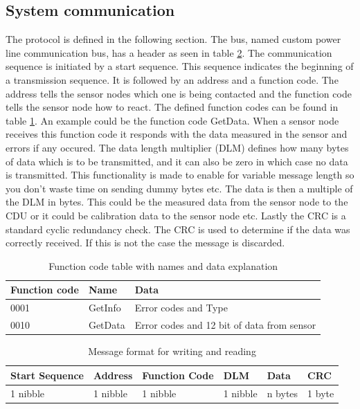 \subsection{System communication}
The protocol is defined in the following section. The bus, named custom power line communication bus, has a header as seen in table \ref{table:stdmsgtosensor}. The communication sequence is initiated by a start sequence. This sequence indicates the beginning of a transmission sequence. It is followed by an address and a function code. The address tells the sensor nodes which one is being contacted and the function code tells the sensor node how to react. The defined function codes can be found in table \ref{table:functioncodes}. An example could be the function code GetData. When a sensor node receives this function code it responds with the data measured in the sensor and errors if any occured. The data length multiplier (DLM) defines how many bytes of data which is to be transmitted, and it can also be zero in which case no data is transmitted. This functionality is made to enable for variable message length so you don't waste time on sending dummy bytes etc. The data is then a multiple of the DLM in bytes. This could be the measured data from the sensor node to the CDU or it could be calibration data to the sensor node etc. Lastly the CRC is a standard cyclic redundancy check. The CRC is used to determine if the data was correctly received. If this is not the case the message is discarded. 
\begin{table}[hbpt]
\centering
\begin{tabular}{|l|l|l|}
	\hline
	Function code & Name & Data \\ 
	\hline
	0001 	& GetInfo & Error codes and Type \\
	\hline
	0010	& GetData & Error codes and 12 bit of data from sensor \\
	\hline
\end{tabular}
\caption{Function code table with names and data explanation}
\label{table:functioncodes}
\end{table}
\begin{table}[hbpt]
	\centering
	\begin{tabular}{|l|l|l|l|l|l|}
		\hline
		Start Sequence & Address & Function Code & DLM & Data & CRC  \\ \hline
		1 nibble & 1 nibble	& 1 nibble & 1 nibble & n bytes & 1 byte\\
		\hline
	\end{tabular}
	\caption{Message format for writing and reading}
	\label{table:stdmsgtosensor}
\end{table}
